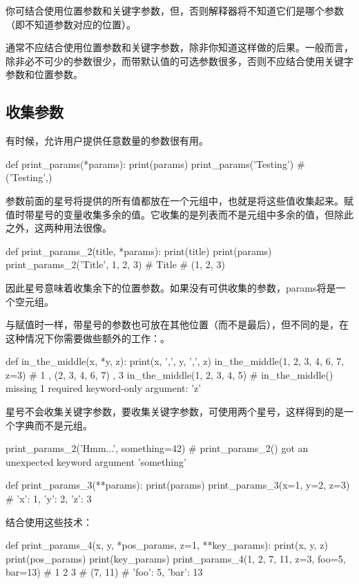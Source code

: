 你可结合使用位置参数和关键字参数，但，否则解释器将不知道它们是哪个参数（即不知道参数对应的位置）。
\begin{tcolorbox}
    通常不应结合使用位置参数和关键字参数，除非你知道这样做的后果。一般而言，除非必不可少的参数很少，而带默认值的可选参数很多，否则不应结合使用关键字参数和位置参数。
\end{tcolorbox}
\subsection{收集参数}
有时候，允许用户提供任意数量的参数很有用。
\begin{pyc}
def print_params(*params):
    print(params)
print_params('Testing')  # ('Testing',)
\end{pyc}
参数前面的星号将提供的所有值都放在一个元组中，也就是将这些值收集起来。赋值时带星号的变量收集多余的值。它收集的是列表而不是元组中多余的值，但除此之外，这两种用法很像。
\begin{pyc}
def print_params_2(title, *params):
    print(title)
    print(params)
print_params_2('Title', 1, 2, 3)
# Title
# (1, 2, 3)
\end{pyc}
因此星号意味着收集余下的位置参数。如果没有可供收集的参数，params将是一个空元组。

与赋值时一样，带星号的参数也可放在其他位置（而不是最后），但不同的是，在这种情况下你需要做些额外的工作：。
\begin{pyc}
def in_the_middle(x, *y, z):
    print(x, ',', y, ',', z)
in_the_middle(1, 2, 3, 4, 6, 7, z=3)  # 1 , (2, 3, 4, 6, 7) , 3
in_the_middle(1, 2, 3, 4, 5)
# in_the_middle() missing 1 required keyword-only argument: 'z'
\end{pyc}
星号不会收集关键字参数，要收集关键字参数，可使用两个星号，这样得到的是一个字典而不是元组。
\begin{pyc}
print_params_2('Hmm...', something=42)
# print_params_2() got an unexpected keyword argument 'something'

def print_params_3(**params):
    print(params)
print_params_3(x=1, y=2, z=3)  # {'x': 1, 'y': 2, 'z': 3}
\end{pyc}

结合使用这些技术：
\begin{pyc}
def print_params_4(x, y, *pos_params, z=1, **key_params):
    print(x, y, z)
    print(pos_params)
    print(key_params)
print_params_4(1, 2, 7, 11, z=3, foo=5, bar=13)
# 1 2 3
# (7, 11)
# {'foo': 5, 'bar': 13}
\end{pyc}

